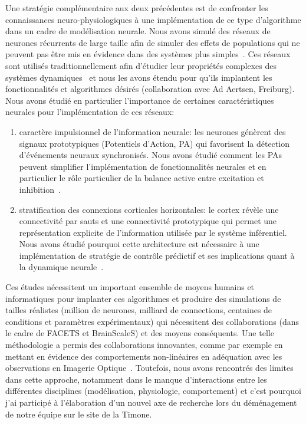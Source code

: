 \documentclass[11pt,french,a4paper,oneside]{article}%
\begin{document}
Une stratégie complémentaire aux deux précédentes est de confronter les connaissances neuro-physiologiques à une implémentation de ce type d'algorithme dans un cadre de modélisation neurale. Nous avons simulé des réseaux de neurones récurrents de large taille afin de simuler des effets de populations qui ne peuvent pas être mis en évidence dans des systèmes plus simples~\citep{Kremkow05}. Ces réseaux sont utilisés traditionnellement afin d'étudier leur propriétés complexes des systèmes dynamiques~\citep{Kremkow07} et nous les avons étendu pour qu'ils implantent les fonctionnalités et algorithmes désirés (collaboration avec Ad Aertsen, Freiburg). Nous avons étudié en particulier l'importance de certaines caractéristiques neurales pour l'implémentation de ces réseaux:
\begin{enumerate}
\item caractère impulsionnel de l'information neurale: les neurones génèrent des signaux prototypiques (Potentiels d'Action, PA) qui favorisent la détection d'événements neuraux synchronisés. Nous avons étudié comment les PAs peuvent simplifier l'implémentation de fonctionnalités neurales et en particulier le rôle particulier de la balance active entre excitation et inhibition~\citep{Kremkow07cns,Kremkow08neurocomp,Kremkow08sfn,Voges08,Kremkow09gns,Kremkow10jcns,Kremkow16}.
\item stratification des connexions corticales horizontales: le cortex révèle une connectivité par sauts et une connectivité prototypique qui permet une représentation explicite de l'information utilisée par le système inférentiel. Nous avons étudié pourquoi cette architecture est nécessaire à une implémentation de stratégie de contrôle prédictif et ses implications quant à la dynamique neurale~\citep{Voges08,Voges08neurocomp,Perrinet09cosyne,Voges09gns,Voges09cosyne,Voges10,Voges12}. 
\end{enumerate}

Ces études nécessitent un important ensemble de moyens humains et informatiques pour implanter ces algorithmes et produire des simulations de tailles réalistes (million de neurones, milliard de connections, centaines de conditions et paramètres expérimentaux) qui nécessitent des collaborations (dans le cadre de FACETS et BrainScaleS) et des moyens conséquents. Une telle méthodologie a permis des collaborations innovantes, comme par exemple en mettant en évidence des comportements non-linéaires en adéquation avec les observations en Imagerie Optique~\citep{Perrinet09vss}. Toutefois, nous avons rencontrés des limites dans cette approche, notamment dans le manque d'interactions entre les différentes disciplines (modélisation, physiologie, comportement) et c'est pourquoi j'ai participé à l'élaboration d'un nouvel axe de recherche lors du déménagement de notre équipe sur le site de la Timone. %
\end{document}
